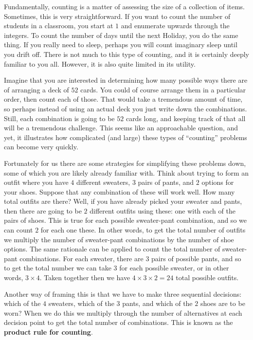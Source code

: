 \documentclass[
  letterpaper,
  DIV=11,
  numbers=noendperiod]{scrreprt}
\theoremstyle{definition}
\theoremstyle{definition}
\theoremstyle{definition}
\theoremstyle{remark}
\begin{document}
Fundamentally, counting is a matter of assessing the size of a
collection of items. Sometimes, this is very straightforward. If you
want to count the number of students in a classroom, you start at \(1\)
and enumerate upwards through the integers. To count the number of days
until the next Holiday, you do the same thing. If you really need to
sleep, perhaps you will count imaginary sleep until you drift off. There
is not much to this type of counting, and it is certainly deeply
familiar to you all. However, it is also quite limited in its utility.

Imagine that you are interested in determining how many possible ways
there are of arranging a deck of \(52\) cards. You could of course
arrange them in a particular order, then count each of those. That would
take a tremendous amount of time, so perhaps instead of using an actual
deck you just write down the combinations. Still, each combination is
going to be \(52\) cards long, and keeping track of that all will be a
tremendous challenge. This seems like an approachable question, and yet,
it illustrates how complicated (and large) these types of ``counting''
problems can become very quickly.

Fortunately for us there are some strategies for simplifying these
problems down, some of which you are likely already familiar with. Think
about trying to form an outfit where you have \(4\) different sweaters,
\(3\) pairs of pants, and \(2\) options for your shoes. Suppose that any
combination of these will work well. How many total outfits are there?
Well, if you have already picked your sweater and pants, then there are
going to be \(2\) different outfits using these: one with each of the
pairs of shoes. This is true for each possible sweater-pant combination,
and so we can count \(2\) for each one these. In other words, to get the
total number of outfits we multiply the number of sweater-pant
combinations by the number of shoe options. The same rationale can be
applied to count the total number of sweater-pant combinations. For each
sweater, there are \(3\) pairs of possible pants, and so to get the
total number we can take \(3\) for each possible sweater, or in other
words, \(3\times 4\). Taken together then we have
\(4\times 3\times 2 = 24\) total possible outfits.

Another way of framing this is that we have to make three sequential
decisions: which of the \(4\) sweaters, which of the \(3\) pants, and
which of the \(2\) shoes are to be worn? When we do this we multiply
through the number of alternatives at each decision point to get the
total number of combinations. This is known as the \textbf{product rule
for counting}.
\end{document}
